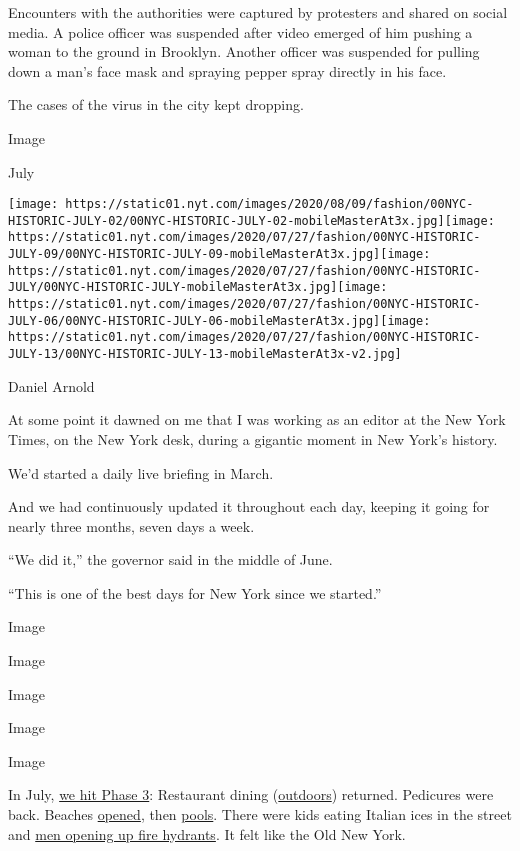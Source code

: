 Encounters with the authorities were captured by protesters and shared
on social media. A police officer was suspended after video emerged of
him pushing a woman to the ground in Brooklyn. Another officer was
suspended for pulling down a man's face mask and spraying pepper spray
directly in his face.

The cases of the virus in the city kept dropping.

Image

July

\texttt{[image: https://static01.nyt.com/images/2020/08/09/fashion/00NYC-HISTORIC-JULY-02/00NYC-HISTORIC-JULY-02-mobileMasterAt3x.jpg]}\texttt{[image: https://static01.nyt.com/images/2020/07/27/fashion/00NYC-HISTORIC-JULY-09/00NYC-HISTORIC-JULY-09-mobileMasterAt3x.jpg]}\texttt{[image: https://static01.nyt.com/images/2020/07/27/fashion/00NYC-HISTORIC-JULY/00NYC-HISTORIC-JULY-mobileMasterAt3x.jpg]}\texttt{[image: https://static01.nyt.com/images/2020/07/27/fashion/00NYC-HISTORIC-JULY-06/00NYC-HISTORIC-JULY-06-mobileMasterAt3x.jpg]}\texttt{[image: https://static01.nyt.com/images/2020/07/27/fashion/00NYC-HISTORIC-JULY-13/00NYC-HISTORIC-JULY-13-mobileMasterAt3x-v2.jpg]}

Daniel Arnold

At some point it dawned on me that I was working as an editor at the New
York Times, on the New York desk, during a gigantic moment in New York's
history.

We'd started a daily live briefing in March.

And we had continuously updated it throughout each day, keeping it going
for nearly three months, seven days a week.

``We did it,'' the governor said in the middle of June.

``This is one of the best days for New York since we started.''

Image

Image

Image

Image

Image

In July,
\href{https://www.nytimes.com/2020/07/06/nyregion/nyc-phase-3-reopening-coronavirus.html}{we
hit Phase 3}: Restaurant dining
(\href{https://www.nytimes.com/2020/06/23/dining/outdoor-restaurants-nyc-coronavirus.html}{outdoors})
returned. Pedicures were back. Beaches
\href{https://www.nytimes.com/interactive/2020/07/07/nyregion/nyc-beaches-open.html?smid=nytcore-ios-share}{opened},
then
\href{https://www.nytimes.com/2020/07/24/nyregion/nyc-pools-open.html}{pools}.
There were kids eating Italian ices in the street and
\href{https://www.tiktok.com/@colita03/video/6854966008730389766}{men
opening up fire hydrants}. It felt like the Old New York.

